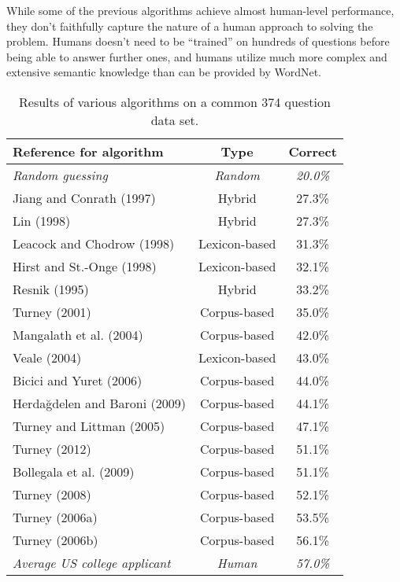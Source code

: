 \documentclass[11pt]{article}
\begin{document}
While some of the previous algorithms achieve almost human-level performance, they don't faithfully capture the nature of a human approach to solving the problem. Humans doesn't need to be ``trained'' on hundreds of questions before being able to answer further ones, and humans utilize much more complex and extensive semantic knowledge than can be provided by WordNet.

\vspace*{1em}

\begin{table}[h!]

\centering
\begin{tabular}{| l | c | c |}
\hline
\textbf{Reference for algorithm} & \textbf{Type} & \textbf{Correct} \\ \hline
\textit{Random guessing} & \textit{Random} & \textit{20.0\%} \\
Jiang and Conrath (1997) & Hybrid & 27.3\% \\
Lin (1998) & Hybrid & 27.3\% \\
Leacock and Chodrow (1998) & Lexicon-based & 31.3\% \\
Hirst and St.-Onge (1998) & Lexicon-based & 32.1\% \\
Resnik (1995) & Hybrid & 33.2\% \\
Turney (2001) & Corpus-based & 35.0\% \\
Mangalath et al. (2004) & Corpus-based & 42.0\% \\
Veale (2004) & Lexicon-based & 43.0\% \\
Bicici and Yuret (2006) & Corpus-based & 44.0\% \\
Herdağdelen and Baroni (2009) & Corpus-based & 44.1\% \\
Turney and Littman (2005) & Corpus-based & 47.1\% \\
Turney (2012) & Corpus-based & 51.1\% \\
Bollegala et al. (2009) & Corpus-based & 51.1\% \\
Turney (2008) & Corpus-based & 52.1\% \\
Turney (2006a) & Corpus-based & 53.5\% \\
Turney (2006b) & Corpus-based & 56.1\% \\
\textit{Average US college applicant} & \textit{Human} & \textit{57.0\%} \\ \hline
\end{tabular}

\caption[foo]{Results of various algorithms on a common 374 question data set.\footnotemark}
\label{comparison}

\end{table}
\end{document}
